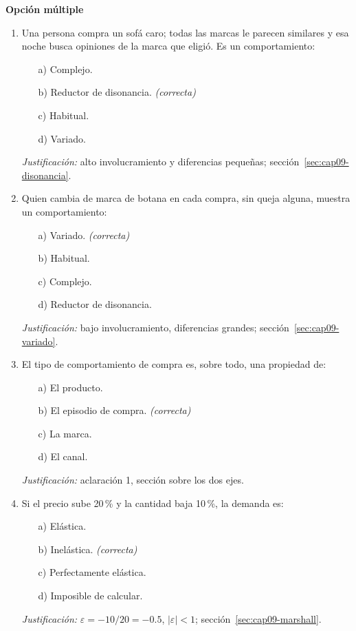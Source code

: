 \textbf{Opción múltiple}

\begin{enumerate}
  \item Una persona compra un sofá caro; todas las marcas le parecen similares y esa
  noche busca opiniones de la marca que eligió. Es un comportamiento:
  \begin{enumerate}
    \item[a)] Complejo.
    \item[b)] Reductor de disonancia. \textit{(correcta)}
    \item[c)] Habitual.
    \item[d)] Variado.
  \end{enumerate}
  \textit{Justificación:} alto involucramiento y diferencias pequeñas;
  sección~\ref{sec:cap09-disonancia}.

  \item Quien cambia de marca de botana en cada compra, sin queja alguna,
  muestra un comportamiento:
  \begin{enumerate}
    \item[a)] Variado. \textit{(correcta)}
    \item[b)] Habitual.
    \item[c)] Complejo.
    \item[d)] Reductor de disonancia.
  \end{enumerate}
  \textit{Justificación:} bajo involucramiento, diferencias grandes;
  sección~\ref{sec:cap09-variado}.

  \item El tipo de comportamiento de compra es, sobre todo, una propiedad de:
  \begin{enumerate}
    \item[a)] El producto.
    \item[b)] El episodio de compra. \textit{(correcta)}
    \item[c)] La marca.
    \item[d)] El canal.
  \end{enumerate}
  \textit{Justificación:} aclaración 1, sección sobre los dos ejes.

  \item Si el precio sube 20\,\% y la cantidad baja 10\,\%, la demanda es:
  \begin{enumerate}
    \item[a)] Elástica.
    \item[b)] Inelástica. \textit{(correcta)}
    \item[c)] Perfectamente elástica.
    \item[d)] Imposible de calcular.
  \end{enumerate}
  \textit{Justificación:} $\varepsilon=-10/20=-0.5$, $|\varepsilon|<1$;
  sección~\ref{sec:cap09-marshall}.


\end{enumerate}
